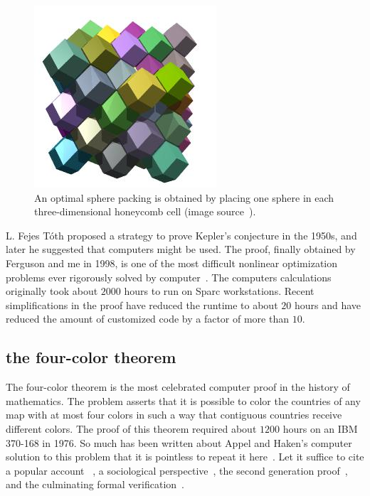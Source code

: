 \documentclass{llncs}
\begin{document}
\begin{figure}[h!]
  \centering
\includegraphics[scale=0.5]{Rhombic_dodecahedra.jpg}
\caption{An optimal sphere packing is obtained by placing one sphere
  in each three-dimensional honeycomb cell (image
  source~\cite{rhombic}).}
\label{fig:rhombic}
\end{figure}

L. Fejes T\'oth proposed a strategy to prove Kepler's conjecture in
the 1950s, and later he suggested that computers might be used.  The
proof, finally obtained by Ferguson and me in 1998, is one of the
most difficult nonlinear optimization problems ever rigorously solved
by computer~\cite{Hales:2005:Annals}.  The computers calculations
originally took about $2000$ hours to run on Sparc workstations.
Recent simplifications in the proof have reduced the runtime to about
$20$ hours and have reduced the amount of customized code by a factor
of more than $10$.


\subsection{the four-color theorem}

The four-color theorem is the most celebrated computer proof in the
history of mathematics.  The problem asserts that it is possible to
color the countries of any map with at most four colors in such a way
that contiguous countries receive different colors.  The proof of this
theorem required about $1200$ hours on an IBM 370-168 in 1976. So much
has been written about Appel and Haken's computer solution to this
problem that it is pointless to repeat it here~\cite{AH4CT}.  Let it
suffice to cite a popular account ~\cite{Wil4CT}, a sociological
perspective~\cite{Mac}, the second generation
proof~\cite{Robertson:1997:JCTB}, and the culminating formal
verification~\cite{gonthier:2008:formal}.
\end{document}
